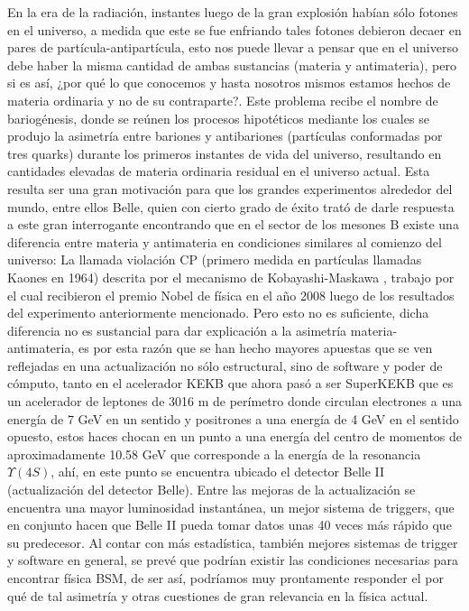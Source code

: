 En la era de la radiación, instantes luego de la gran explosión habían sólo fotones en el universo, a medida que este se fue enfriando tales fotones debieron decaer en pares de partícula-antipartícula, esto nos puede llevar a pensar que en el universo debe haber la misma cantidad de ambas sustancias (materia y antimateria), pero si es así, ¿por qué lo que conocemos y hasta nosotros mismos estamos hechos de materia ordinaria y no de su contraparte?. Este problema recibe el nombre de bariogénesis, donde se reúnen los procesos hipotéticos mediante los cuales se produjo la asimetría entre bariones y antibariones (partículas conformadas por tres quarks) durante los primeros instantes de vida del universo, resultando en cantidades elevadas de materia ordinaria residual en el universo actual. Esta resulta ser una gran motivación para que los grandes experimentos alrededor del mundo, entre ellos Belle, quien con cierto grado de éxito trató de darle respuesta a este gran interrogante encontrando que en el sector de los mesones B existe una diferencia entre materia y antimateria en condiciones similares al comienzo del universo: La llamada violación CP (primero medida en partículas llamadas Kaones en 1964) descrita por el mecanismo de Kobayashi-Maskawa \cite{Kobayashi:1973fv}, trabajo por el cual recibieron el premio Nobel de física en el año 2008 luego de los resultados del experimento anteriormente mencionado. Pero esto no es suficiente, dicha diferencia no es sustancial para dar explicación a la asimetría materia-antimateria, es por esta razón que se han hecho mayores apuestas que se ven reflejadas en una actualización no sólo estructural, sino de software y poder de cómputo, tanto en el acelerador KEKB que ahora pasó a ser SuperKEKB que es un acelerador de leptones de 3016 m de perímetro donde circulan electrones a una energía de 7 GeV en un sentido y positrones a una energía de 4 GeV en el sentido opuesto, estos haces chocan en un punto a una energía del centro de momentos de aproximadamente 10.58 GeV que corresponde a la energía de la resonancia \(\Upsilon (4S)\), ahí, en este punto se encuentra ubicado el detector Belle II (actualización del detector Belle). Entre las mejoras de la actualización se encuentra una mayor luminosidad instantánea, un mejor sistema de triggers, que en conjunto hacen que Belle II pueda tomar datos unas 40 veces más rápido que su predecesor. Al contar con más estadística, también mejores sistemas de trigger y software en general, se prevé que podrían existir las condiciones necesarias para encontrar física BSM, de ser así, podríamos muy prontamente responder el por qué de tal asimetría y otras cuestiones de gran relevancia en la física actual.

